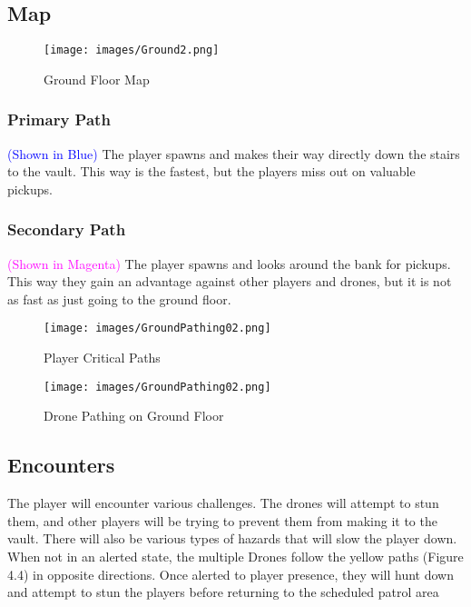 \documentclass[10pt]{report}
\begin{document}
\subsection{Map}

\begin{figure}[H]
    \centering
    \texttt{[image: images/Ground2.png]}
    \caption{Ground Floor Map}
\end{figure}

\subsubsection{Primary Path}

\textcolor{blue}{(Shown in Blue)} The player spawns and makes their way directly down the stairs to the vault. This way is the fastest, but the players miss out on valuable pickups.

\subsubsection{Secondary Path}

\textcolor{magenta}{(Shown in Magenta)} The player spawns and looks around the bank for pickups. This way they gain an advantage against other players and drones, but it is not as fast as just going to the ground floor.

\begin{figure}[H]
    \centering
    \texttt{[image: images/GroundPathing02.png]}
    \caption{Player Critical Paths}
\end{figure}

\begin{figure}[H]
    \centering
    \texttt{[image: images/GroundPathing02.png]}
    \caption{Drone Pathing on Ground Floor}
\end{figure}

\subsection{Encounters}

The player will encounter various challenges. The drones will attempt to stun them, and other players will be trying to prevent them from making it to the vault. There will also be various types of hazards that will slow the player down. When not in an alerted state, the multiple Drones follow the yellow paths (Figure 4.4) in opposite directions. Once alerted to player presence, they will hunt down and attempt to stun the players before returning to the scheduled patrol area
\end{document}
